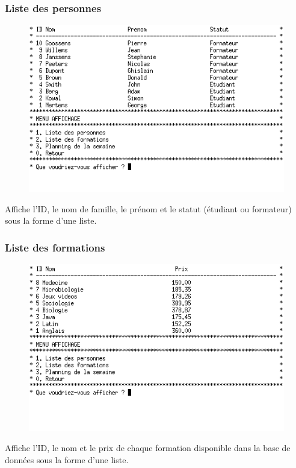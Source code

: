 \documentclass[11pt]{article}
\begin{document}
\newpage
\subsubsection{Liste des personnes}
\begin{figure}[ht]
  \centering
  \includegraphics[trim=0 40 0 0, clip, scale=0.8]{images/03.png.png}
\end{figure}
Affiche l'ID, le nom de famille, le prénom et le statut (étudiant ou formateur) sous la forme d'une liste.

\subsubsection{Liste des formations}
\begin{figure}[ht]
  \centering
  \includegraphics[trim=0 60 0 0, clip, scale=0.8]{images/04.png.png}
\end{figure}
Affiche l'ID, le nom et le prix de chaque formation disponible dans la base de données sous la forme d'une liste.
\end{document}

